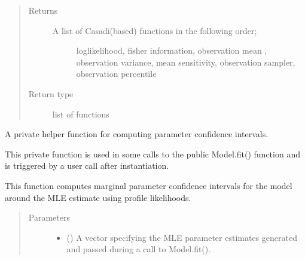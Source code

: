 \documentclass[letterpaper,10pt,english,openany,oneside]{sphinxmanual}
\begin{document}
\begin{fulllineitems}
\begin{fulllineitems}
\begin{quote}
\begin{description}
\begin{itemize}
\end{itemize}

\item[{Returns}] \leavevmode
\begin{description}
\item[{A list of Casadi(\sphinxhyphen{}based) functions in the following order;}] \leavevmode
loglikelihood, fisher information, observation mean , observation variance,
mean sensitivity, observation sampler, observation percentile

\end{description}


\item[{Return type}] \leavevmode
list of functions

\end{description}\end{quote}

\end{fulllineitems}


\begin{fulllineitems}
\label{\detokenize{nloed:nloed.model.Model.__confidence_intervals}}
A private helper function for computing parameter confidence intervals.

This private function is used in some calls to the public Model.fit() function and is
triggered by a user call after instantiation.

This function computes marginal parameter confidence intervals for the model
around the MLE estimate using profile likelihoods.
\begin{quote}\begin{description}
\item[{Parameters}] \leavevmode\begin{itemize}
\item {} 
 (\sphinxstyleliteralemphasis{\sphinxupquote{, }}) \textendash{} A vector specifying the MLE parameter estimates generated and
passed during a call to Model.fit().


\end{itemize}
\end{description}
\end{quote}
\end{fulllineitems}
\end{fulllineitems}
\end{document}
